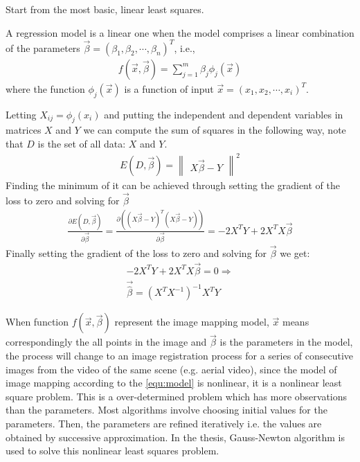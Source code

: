  Start from the most basic, linear least squares. 
\begin{definition}\label{thm:linear least squares}
A regression model is a linear one when the model comprises a linear combination of the parameters $\vec{\beta}=(\beta_{1}, \beta_{2}, \cdots, \beta_{n})^T$, i.e.,
\begin{align} \label{equ:model}
f(\vec{x}, \vec{\beta}) = \sum_{j=1}^{m} \beta_{j} \phi_{j}(\vec{x})
\end{align}
where the function $\phi_{j}(\vec{x}) $ is a function of input $\vec{x} = \left( x_1, x_2, \cdots, x_i\right) ^T$.

Letting $X_{ij} = \phi_{j}(x_{i})$ and putting the independent and dependent variables in matrices $X$ and $Y$ we can compute the sum of squares in the following way, note that $D$ is the set of all data: $X$ and $Y$.
\begin{align}
E(D,  \vec{\beta} ) =  \begin{Vmatrix}X\vec{\beta}- Y\end{Vmatrix}^{2}
\end{align}
Finding the minimum of it can be achieved through setting the gradient of the loss to zero and solving for $\vec{\beta}$
\begin{align}
 \frac{\partial E(D, \vec{\beta})}{\partial \vec{\beta}}  =   \frac{\partial((X\vec{\beta} - Y)^{T}(X\vec{\beta} - Y)) }{\partial \vec{\beta}}=-2X^{T}Y+2X^{T}X\vec{\beta} 
\end{align}
Finally setting the gradient of the loss to zero and solving for $\vec{\beta}$ we get:
\begin{align}
-2X^{T}Y+2X^{T}X\vec{\beta} = 0  \Rightarrow \nonumber \\
\vec{ \hat{\beta} } = (X^{T}X^{-1})^{-1}X^{T}Y
\end{align}
\end{definition}

When function $f(\vec{x}, \vec{\beta})$ represent the image mapping model, $\vec{x}$ means correspondingly the all points in the image and $\vec{\beta}$ is the parameters in the model, the process will change to an image registration process for a series of consecutive images from the video of the same scene (e.g. aerial video), since the model of image mapping according to the \cref{equ:model} is nonlinear, it is a nonlinear least square problem. This is a over-determined  problem which has more observations than the parameters.  Most algorithms involve choosing initial values for the parameters. Then, the parameters are refined iteratively i.e. the values are obtained by successive approximation. In the thesis, Gauss-Newton algorithm is used to solve this nonlinear least squares problem. 

